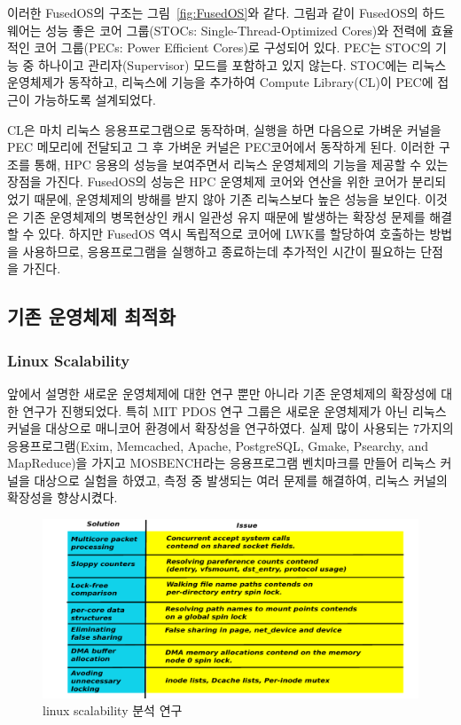 이러한 FusedOS의 구조는 그림~\ref{fig:FusedOS}와 같다. 
그림과 같이 FusedOS의 하드웨어는 성능 좋은 코어 그룹(STOCs: Single-Thread-Optimized Cores)와
전력에 효율적인 코어 그룹(PECs: Power Efficient Cores)로 구성되어 있다.
PEC는 STOC의 기능 중 하나이고 관리자(Supervisor) 모드를 포함하고 있지 않는다. 
STOC에는 리눅스 운영체제가 동작하고, 리눅스에 기능을 추가하여 Compute Library(CL)이 PEC에 
접근이 가능하도록 설계되었다.

CL은 마치 리눅스 응용프로그램으로 동작하며, 실행을 하면 다음으로 가벼운 커널을 PEC 메모리에 
전달되고 그 후 가벼운 커널은 PEC코어에서 동작하게 된다.
이러한 구조를 통해, HPC 응용의 성능을 보여주면서 리눅스 운영체제의 기능을 제공할 수 있는 장점을 가진다. 
FusedOS의 성능은 HPC 운영체제 코어와 연산을 위한 코어가 분리되었기 때문에, 운영체제의 
방해를 받지 않아 기존 리눅스보다 높은 성능을 보인다.
이것은 기존 운영체제의 병목현상인 캐시 일관성 유지 때문에 발생하는 확장성 문제를 해결할 수 있다.
하지만 FusedOS 역시 독립적으로 코어에 LWK를 할당하여 호출하는 방법을 사용하므로,  
응용프로그램을 실행하고 종료하는데 추가적인 시간이 필요하는 단점을 가진다.

\subsection{기존 운영체제 최적화}

\subsubsection{Linux Scalability}

앞에서 설명한 새로운 운영체제에 대한 연구 뿐만 아니라 기존 운영체제의 확장성에 대한 연구가 진행되었다. 
특히 MIT PDOS 연구 그룹은 새로운 운영체제가 아닌 리눅스 커널을 대상으로 매니코어 환경에서 확장성을 연구하였다.
실제 많이 사용되는 7가지의 응용프로그램(Exim, Memcached, Apache, PostgreSQL, Gmake, Psearchy,
and MapReduce)을 가지고 MOSBENCH라는 응용프로그램 벤치마크를 만들어 리눅스 커널을 
대상으로 실험을 하였고, 측정 중 발생되는 여러 문제를 해결하여, 리눅스 커널의 확장성을 향상시켰다.

\begin{figure}[h!]
    \centering
    \includegraphics[width=1\textwidth]{fig/linux/linux}
    \caption{linux scalability 분석 연구}
  \label{fig:linux}
\end{figure}

